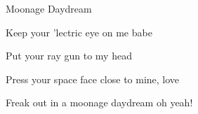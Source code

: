 \begin{song}{Moonage Daydream}{
	
	\chordset[Verse]{ \DMajShA \FshMaj  }
	\vspace{1em}
	\chordset{ \Bm \AMaj \EMaj \GMaj \DMaj \Fshm \BmBassA}

	\chordset[Bridge]{ \GMaj \DMaj \EMaj}
	
}
\begin{songverse}
\end{songverse}
\vfill

\begin{songchorus}

Keep your 'lectric eye on me babe

Put your ray gun  to my head

Press your space face close to mine, love

Freak out in a moonage daydream oh yeah!

\end{songchorus}


	\hspace{10pt} \hspace{20pt}  \hspace{20pt}    \hspace{20pt}  

\end{song}